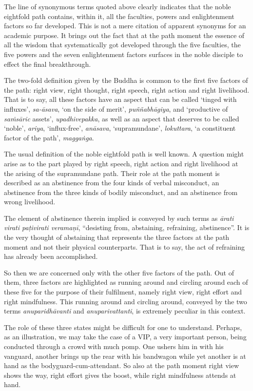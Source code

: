 The line of synonymous terms quoted above clearly indicates that the noble eightfold path contains, within it, all the faculties, powers and enlightenment factors so far developed. This is not a mere citation of apparent synonyms for an academic purpose. It brings out the fact that at the path moment the essence of all the wisdom that systematically got developed through the five faculties, the five powers and the seven enlightenment factors surfaces in the noble disciple to effect the final breakthrough.

The two-fold definition given by the Buddha is common to the first five factors of the path: right view, right thought, right speech, right action and right livelihood. That is to say, all these factors have an aspect that can be called `tinged with influxes', \emph{sa-āsava}, `on the side of merit', \emph{puññabhāgiya}, and `productive of \emph{saṁsāric} assets', \emph{upadhivepakka}, as well as an aspect that deserves to be called `noble', \emph{ariya}, `influx-free', \emph{anāsava}, `supramundane', \emph{lokuttara}, `a constituent factor of the path', \emph{maggaṅga}.

The usual definition of the noble eightfold path is well known. A question might arise as to the part played by right speech, right action and right livelihood at the arising of the supramundane path. Their role at the path moment is described as an abstinence from the four kinds of verbal misconduct, an abstinence from the three kinds of bodily misconduct, and an abstinence from wrong livelihood.

The element of abstinence therein implied is conveyed by such terms as \emph{ārati virati paṭivirati veramaṇī}, ``desisting from, abstaining, refraining, abstinence''. It is the very thought of abstaining that represents the three factors at the path moment and not their physical counterparts. That is to say, the act of refraining has already been accomplished.

So then we are concerned only with the other five factors of the path. Out of them, three factors are highlighted as running around and circling around each of these five for the purpose of their fulfilment, namely right view, right effort and right mindfulness. This running around and circling around, conveyed by the two terms \emph{anuparidhāvanti} and \emph{anuparivattanti}, is extremely peculiar in this context.

The role of these three states might be difficult for one to understand. Perhaps, as an illustration, we may take the case of a VIP, a very important person, being conducted through a crowd with much pomp. One ushers him in with his vanguard, another brings up the rear with his bandwagon while yet another is at hand as the bodyguard-cum-attendant. So also at the path moment right view shows the way, right effort gives the boost, while right mindfulness attends at hand.

